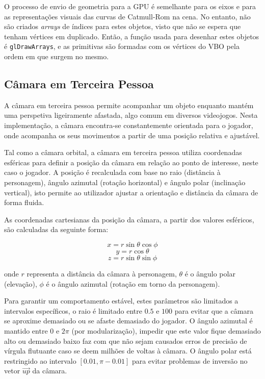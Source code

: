 \documentclass[12pt, a4paper]{article}
\begin{document}
O processo de envio de geometria para a GPU é semelhante para os eixos e para as representações
visuais das curvas de Catmull-Rom na cena. No entanto, não são criados \emph{arrays} de índices para
estes objetos, visto que não se espera que tenham vértices em duplicado. Então, a função usada para
desenhar estes objetos é \texttt{glDrawArrays}, e as primitivas são formadas com os vértices do VBO
pela ordem em que surgem no mesmo.

\subsection{Câmara em Terceira Pessoa}

A câmara em terceira pessoa permite acompanhar um objeto enquanto mantém uma
perspetiva ligeiramente afastada, algo comum em diversos videojogos. Nesta implementação, a câmara
encontra-se constantemente orientada para o jogador, onde acompanha os seus movimentos a partir de
uma posição relativa e ajustável.

Tal como a câmara orbital, a câmara em terceira pessoa utiliza coordenadas esféricas para definir a
posição da câmara em relação ao ponto de interesse, neste caso o jogador. A posição é recalculada
com base no raio (distância à personagem), ângulo azimutal (rotação horizontal) e ângulo polar
(inclinação vertical), isto permite ao utilizador ajustar a orientação e distância da câmara de
forma fluida.

As coordenadas cartesianas da posição da câmara, a partir dos valores esféricos, são calculadas da
seguinte forma:

$$x = r \sin \theta \cos \phi$$
$$y = r \cos \theta$$
$$z = r \sin \theta \sin \phi$$

onde $r$ representa a distância da câmara à personagem, $\theta$ é o ângulo polar (elevação),
$\phi$ é o ângulo azimutal (rotação em torno da personagem).

Para garantir um comportamento estável, estes parâmetros são limitados a intervalos específicos, o
raio é limitado entre $0.5$ e $100$ para evitar que a câmara se aproxime demasiado ou se afaste
demasiado do jogador. O ângulo azimutal é mantido entre $0$ e $2\pi$ (por modularização), impedir
que este valor fique demasiado alto ou demasiado baixo faz com que não sejam causados erros de
precisão de vírgula flutuante caso se deem milhões de voltas à câmara. O ângulo polar está
restringido ao intervalo $[0.01, \pi - 0.01]$ para evitar problemas de inversão no vetor $\vec{up}$
da câmara.
\end{document}

